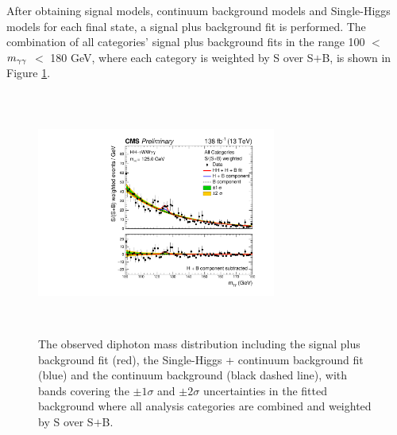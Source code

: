 After obtaining signal models, continuum background models and Single-Higgs models for each final state, a signal plus background fit is performed.
The combination of all categories' signal plus background fits in the range 100 $<$ $m_{\gamma\gamma}$ $<$ 180 GeV, where each category is weighted by S over S$+$B, is shown in Figure \ref{fig:Run2SplusB}.

\begin{figure}[!htbp]
  \centering
  \includegraphics[width=0.7\textwidth,height=8cm]{Images/Results/All_combined_SplusB.pdf}
 \caption{The observed diphoton mass distribution including the signal plus background fit (red), the Single-Higgs + continuum background fit (blue) and the continuum background (black dashed line), 
 with bands covering the $\pm 1\sigma$ and $\pm 2\sigma$ uncertainties in the fitted background where all analysis categories are combined and weighted by S over S$+$B.}
  \label{fig:Run2SplusB}
\end{figure}
